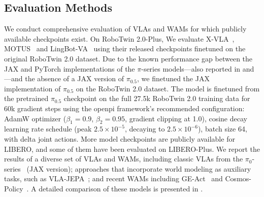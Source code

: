 \documentclass{article}
\begin{document}
\subsection{Evaluation Methods}

We conduct comprehensive evaluation of VLAs and WAMs for which publicly available checkpoints exist. On RoboTwin 2.0-Plus, We evaluate X-VLA~\citep{zheng2026xvla}, MOTUS~\citep{bi2025motus} and LingBot-VA~\citep{li2026causal} using their released checkpoints finetuned on the original RoboTwin 2.0 dataset. Due to the known performance gap between the JAX and PyTorch implementations of the $\pi$-series models---also reported in \citet{bi2025motus} and \citet{li2026causal}---and the absence of a JAX version of $\pi_{0.5}$, we finetuned the JAX implementation of $\pi_{0.5}$ on the RoboTwin 2.0 dataset. The model is finetuned from the pretrained $\pi_{0.5}$ checkpoint on the full 27.5k RoboTwin 2.0 training data for 60k gradient steps using the openpi framework's recommended configuration: AdamW   optimizer ($\beta_1{=}0.9$, $\beta_2{=}0.95$, gradient clipping at 1.0), cosine decay learning rate schedule (peak $2.5{\times}10^{-5}$, decaying to $2.5{\times}10^{-6}$), batch size 64, with delta joint actions. More model checkpoints are publicly available for LIBERO, and some of them have been evaluated on LIBERO-Plus. We report the results of a diverse set of VLAs and WAMs, including classic VLAs from the $\pi_0$-series~\citep{black2025pi0, pi05} (JAX version); approaches that incorporate world modeling as auxiliary tasks, such as VLA-JEPA~\citep{sun2026vla}; and recent WAMs including GE-Act~\citep{liao2025genie} and Cosmos-Policy~\citep{kim2026cosmos}. A detailed comparison of these models is presented in . 


\end{document}
